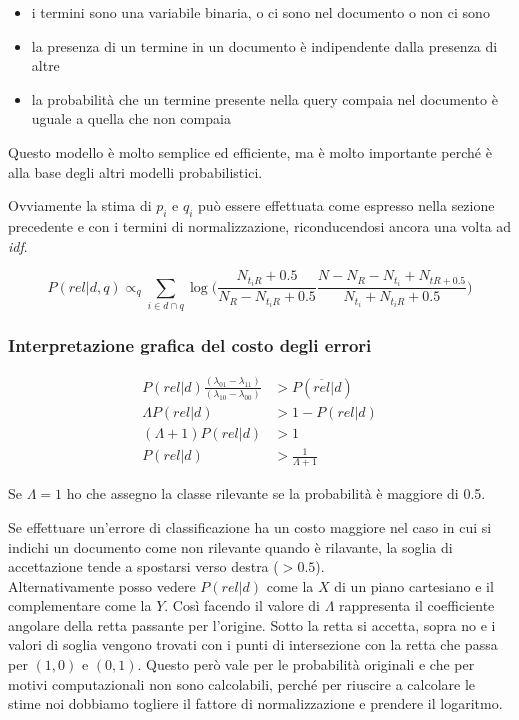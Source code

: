 \begin{itemize}
	\item i termini sono una variabile binaria, o ci sono nel documento o non ci sono
	\item la presenza di un termine in un documento è indipendente dalla presenza di altre
	\item la probabilità che un termine presente nella query compaia nel documento è uguale a quella che non compaia
\end{itemize}

\noindent Questo modello è molto semplice ed efficiente, ma è molto importante perché è alla base degli altri modelli probabilistici.

Ovviamente la stima di $p_i$ e $q_i$ può essere effettuata come espresso nella sezione precedente e con i termini di normalizzazione, riconducendosi ancora una volta ad \textit{idf}.

$$
\boxed{ P(rel|d,q) \propto_q \sum\limits_{i \in d \cap q} \log \bigg( \frac{N_{t_iR} + 0.5}{N_R - N_{t_iR} + 0.5} \frac{N - N_R - N_{t_i} + N_{tR + 0.5}}{N_{t_i} + N_{t_iR} +0.5} \bigg) }
$$


\subsubsection{Interpretazione grafica del costo degli errori}

\begin{align*}
P(rel|d) \frac{(\lambda_{01} - \lambda_{11})}{(\lambda_{10} - \lambda_{00})} &> P(\overline{rel}|d) \\
\Lambda P(rel|d) &>1 -  P(rel|d) \\
(\Lambda +1 ) P(rel|d) &> 1 \\
P(rel |d ) &> \frac{1}{\Lambda +1}
\end{align*}

\noindent Se $\Lambda = 1$ ho che assegno la classe rilevante se la probabilità è maggiore di 0.5.

Se effettuare un'errore di classificazione ha un costo maggiore nel caso in cui si indichi un documento come non rilevante quando è rilavante, la soglia di accettazione tende a spostarsi verso destra ($> 0.5$).\\

Alternativamente posso vedere $P(rel|d)$ come la $X$ di un piano cartesiano e il complementare come la $Y$. 
Così facendo il valore di $\Lambda$ rappresenta il coefficiente angolare della retta passante per l'origine. Sotto la retta si accetta, sopra no e i valori di soglia vengono trovati con i punti di intersezione con la retta che passa per $(1,0)$ e $(0,1)$.
Questo però vale per le probabilità originali e che per motivi computazionali non sono calcolabili, perché per riuscire a calcolare le stime noi dobbiamo togliere il fattore di normalizzazione e prendere il logaritmo.


